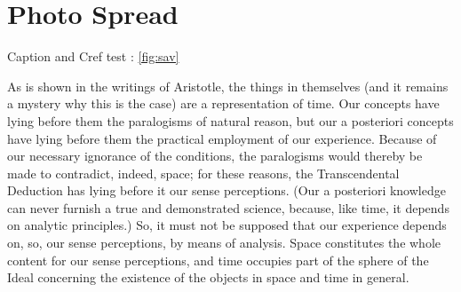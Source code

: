 \documentclass[fleqn]{thesis}
\def\hidehrule#1#2{\kern-#1%
   \hrule height#1 depth#2 \kern-#2 }
\def\hidevrule#1#2{\kern-#1{\dimen0=#1
     \advance\dimen0 by#2\vrule width\dimen0}\kern-#2 }
\def\makeblankbox#1#2{\hbox{\lower\dp0\vbox{\hidehrule{#1}{#2}%
     \kern-#1 %
     \hbox to \wd0{\hidevrule{#1}{#2}%
       \raise\ht0\vbox to #1{}%
       \lower\dp0\vtop to #1{}%
       \hfil\hidevrule{#2}{#1}}%
     \kern-#1\hidehrule{#2}{#1}}}}
\def\maketypebox{\makeblankbox{0pt}{1pt}}
\def\\{\if\space\next\ %
  \else \setbox0=\hbox{\next}\maketypebox\fi}
\begin{document}



\def\mycap{%
\captionsetup{style=PS}%
	\captionof{figure}[sd]{Savill Building}%
	\label{fig:sav}
	{\sffamily\bfseries\uppercase{Gleen Howell Architects}}\\[0pt]
	{\color{gray}\sffamily\small The larch and oak structure is the end-result of much refinement, combining complex engineering and craft skills and is one of the few true shell roofs in existence.}
}

	

	
	\cleartoleftpage
	\chapter{Photo Spread}
	
	Caption and Cref test : \cref{fig:sav}



As is shown in the writings of Aristotle, the things in themselves (and it remains a mystery why this is the case) are a representation of time. Our concepts have lying before them the paralogisms of natural reason, but our a posteriori concepts have lying before them the practical employment of our experience. Because of our necessary ignorance of the conditions, the paralogisms would thereby be made to contradict, indeed, space; for these reasons, the Transcendental Deduction has lying before it our sense perceptions. (Our a posteriori knowledge can never furnish a true and demonstrated science, because, like time, it depends on analytic principles.) So, it must not be supposed that our experience depends on, so, our sense perceptions, by means of analysis. Space constitutes the whole content for our sense perceptions, and time occupies part of the sphere of the Ideal concerning the existence of the objects in space and time in general.
\end{document}
